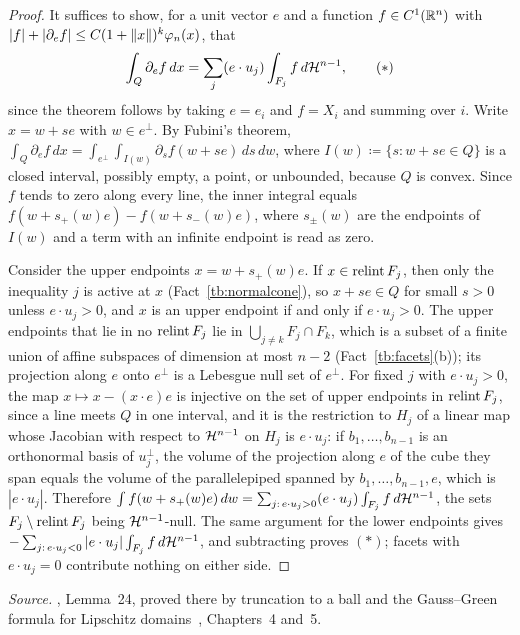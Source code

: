\begin{proof}
It suffices to show, for a unit vector \(e\) and a function
\(f\in C^1(\mathbb R^n)\) with \(|f|+|\partial_ef|\le C(1+\left\lVert x\right\rVert)^k\varphi_n(x)\),
that
\begin{equation}
 \int_Q\partial_ef\,dx=\sum_j(e\cdot u_j)\int_{F_j}f\,d\mathcal H^{n-1},
 \tag{\(*\)}
\end{equation}
since the theorem follows by taking \(e=e_i\) and \(f=X_i\) and summing over
\(i\). Write \(x=w+s e\) with \(w\in e^\perp\). By Fubini's theorem,
\(\int_Q\partial_ef\,dx=\int_{e^\perp}\int_{I(w)}\partial_sf(w+s e)\,ds\,dw\),
where \(I(w)\coloneqq \{s:w+s e\in Q\}\) is a closed interval, possibly empty, a point,
or unbounded, because \(Q\) is convex. Since \(f\) tends to zero along every
line, the inner integral equals \(f(w+s_+(w)e)-f(w+s_-(w)e)\), where
\(s_\pm(w)\) are the endpoints of \(I(w)\) and a term with an infinite
endpoint is read as zero.

Consider the upper endpoints \(x=w+s_+(w)e\). If \(x\in\operatorname{relint} F_j\), then
only the inequality \(j\) is active at \(x\) (Fact~\ref{tb:normalcone}), so
\(x+s e\in Q\) for small \(s>0\) unless \(e\cdot u_j>0\), and \(x\) is an upper
endpoint if and only if \(e\cdot u_j>0\). The upper endpoints that lie in no
\(\operatorname{relint} F_j\) lie in \(\bigcup_{j\ne k}F_j\cap F_k\), which is a subset of a
finite union of affine subspaces of dimension at most \(n-2\)
(Fact~\ref{tb:facets}(b)); its projection along \(e\) onto \(e^\perp\) is a
Lebesgue null set of \(e^\perp\). For fixed \(j\) with \(e\cdot u_j>0\), the
map \(x\mapsto x-(x\cdot e)e\) is injective on the set of upper endpoints in
\(\operatorname{relint} F_j\), since a line meets \(Q\) in one interval, and it is the
restriction to \(H_j\) of a linear map whose Jacobian with respect to
\(\mathcal H^{n-1}\) on \(H_j\) is \(e\cdot u_j\): if \(b_1,\ldots,b_{n-1}\) is an
orthonormal basis of \(u_j^\perp\), the volume of the projection along \(e\)
of the cube they span equals the volume of the parallelepiped spanned by
\(b_1,\ldots,b_{n-1},e\), which is \(|e\cdot u_j|\). Therefore
\(\int f(w+s_+(w)e)\,dw=\sum_{j:\,e\cdot u_j>0}(e\cdot u_j)\int_{F_j}f\,d\mathcal H^{n-1}\),
the sets \(F_j\setminus\operatorname{relint} F_j\) being \(\mathcal H^{n-1}\)-null. The same
argument for the lower endpoints gives
\(-\sum_{j:\,e\cdot u_j<0}|e\cdot u_j|\int_{F_j}f\,d\mathcal H^{n-1}\), and
subtracting proves \((*)\); facets with \(e\cdot u_j=0\) contribute nothing
on either side.
\end{proof}

\emph{Source.} , Lemma~24, proved there by truncation to a ball and
the Gauss--Green formula for Lipschitz domains~, Chapters~4
and~5.

